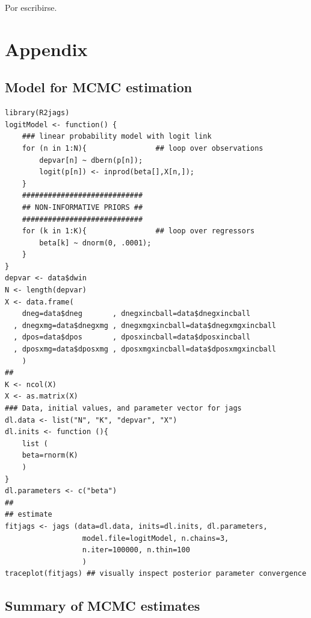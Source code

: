 \documentclass[letter,12pt]{article}
\begin{document}
\noindent Por escribirse.

\newpage

\section{Appendix}

\subsection{Model for MCMC estimation}

\begin{scriptsize}
\begin{verbatim}
library(R2jags)
logitModel <- function() {
    ### linear probability model with logit link
    for (n in 1:N){                ## loop over observations
        depvar[n] ~ dbern(p[n]);   
        logit(p[n]) <- inprod(beta[],X[n,]);
    }
    ############################
    ## NON-INFORMATIVE PRIORS ##
    ############################
    for (k in 1:K){                ## loop over regressors
        beta[k] ~ dnorm(0, .0001);
    }
}
depvar <- data$dwin
N <- length(depvar)
X <- data.frame(
    dneg=data$dneg       , dnegxincball=data$dnegxincball
  , dnegxmg=data$dnegxmg , dnegxmgxincball=data$dnegxmgxincball
  , dpos=data$dpos       , dposxincball=data$dposxincball
  , dposxmg=data$dposxmg , dposxmgxincball=data$dposxmgxincball
    )
##
K <- ncol(X)
X <- as.matrix(X)
### Data, initial values, and parameter vector for jags
dl.data <- list("N", "K", "depvar", "X")
dl.inits <- function (){
    list (
    beta=rnorm(K)
    )
}
dl.parameters <- c("beta")
##
## estimate
fitjags <- jags (data=dl.data, inits=dl.inits, dl.parameters,
                  model.file=logitModel, n.chains=3,
                  n.iter=100000, n.thin=100
                  )
traceplot(fitjags) ## visually inspect posterior parameter convergence
\end{verbatim}
\end{scriptsize}

\subsection{Summary of MCMC estimates}
\end{document}
